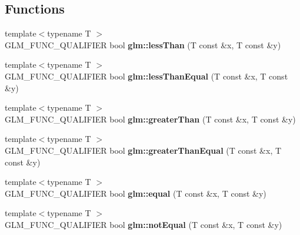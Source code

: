 \subsection*{Functions}
\begin{DoxyCompactItemize}
\item 
\mbox{\label{scalar__relational_8inl_a6f2a3cef357dbf21b5fc90aded289ba1}} 
{\footnotesize template$<$typename T $>$ }\\G\+L\+M\+\_\+\+F\+U\+N\+C\+\_\+\+Q\+U\+A\+L\+I\+F\+I\+ER bool {\bfseries glm\+::less\+Than} (T const \&x, T const \&y)
\item 
\mbox{\label{scalar__relational_8inl_a299eb11fb67637d37144dc0fcc6c6ff3}} 
{\footnotesize template$<$typename T $>$ }\\G\+L\+M\+\_\+\+F\+U\+N\+C\+\_\+\+Q\+U\+A\+L\+I\+F\+I\+ER bool {\bfseries glm\+::less\+Than\+Equal} (T const \&x, T const \&y)
\item 
\mbox{\label{scalar__relational_8inl_ae567b870c79fb61cf069d489133eaf48}} 
{\footnotesize template$<$typename T $>$ }\\G\+L\+M\+\_\+\+F\+U\+N\+C\+\_\+\+Q\+U\+A\+L\+I\+F\+I\+ER bool {\bfseries glm\+::greater\+Than} (T const \&x, T const \&y)
\item 
\mbox{\label{scalar__relational_8inl_a03e93d49cec76267c3e11fd68381639a}} 
{\footnotesize template$<$typename T $>$ }\\G\+L\+M\+\_\+\+F\+U\+N\+C\+\_\+\+Q\+U\+A\+L\+I\+F\+I\+ER bool {\bfseries glm\+::greater\+Than\+Equal} (T const \&x, T const \&y)
\item 
\mbox{\label{scalar__relational_8inl_a9943cfbeef0a00a2becb541e9e3818ed}} 
{\footnotesize template$<$typename T $>$ }\\G\+L\+M\+\_\+\+F\+U\+N\+C\+\_\+\+Q\+U\+A\+L\+I\+F\+I\+ER bool {\bfseries glm\+::equal} (T const \&x, T const \&y)
\item 
\mbox{\label{scalar__relational_8inl_ab4ee9100dc2b4e41ef91ff6898f979e2}} 
{\footnotesize template$<$typename T $>$ }\\G\+L\+M\+\_\+\+F\+U\+N\+C\+\_\+\+Q\+U\+A\+L\+I\+F\+I\+ER bool {\bfseries glm\+::not\+Equal} (T const \&x, T const \&y)

\end{DoxyCompactItemize}
